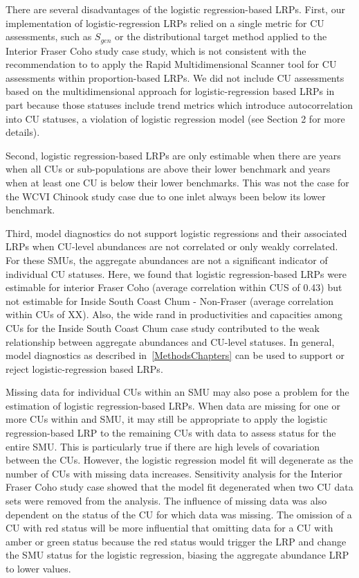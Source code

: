 \documentclass[11pt]{book}
\begin{document}
There are several disadvantages of the logistic regression-based LRPs. First, our implementation of logistic-regression LRPs relied on a single metric for CU assessments, such as \(S_{gen}\) or the distributional target method applied to the Interior Fraser Coho study case study, which is not consistent with the recommendation to to apply the Rapid Multidimensional Scanner tool for CU assessments within proportion-based LRPs. We did not include CU assessments based on the multidimensional approach for logistic-regression based LRPs in part because those statuses include trend metrics which introduce autocorrelation into CU statuses, a violation of logistic regression model (see Section 2 for more details).

Second, logistic regression-based LRPs are only estimable when there are years when all CUs or sub-populations are above their lower benchmark and years when at least one CU is below their lower benchmarks. This was not the case for the WCVI Chinook study case due to one inlet always been below its lower benchmark.

Third, model diagnostics do not support logistic regressions and their associated LRPs when CU-level abundances are not correlated or only weakly correlated. For these SMUs, the aggregate abundances are not a significant indicator of individual CU statuses. Here, we found that logistic regression-based LRPs were estimable for interior Fraser Coho (average correlation within CUS of 0.43) but not estimable for Inside South Coast Chum - Non-Fraser (average correlation within CUs of XX). Also, the wide rand in productivities and capacities among CUs for the Inside South Coast Chum case study contributed to the weak relationship between aggregate abundances and CU-level statuses. In general, model diagnostics as described in~\ref{MethodsChapters} can be used to support or reject logistic-regression based LRPs.

Missing data for individual CUs within an SMU may also pose a problem for the estimation of logistic regression-based LRPs. When data are missing for one or more CUs within and SMU, it may still be appropriate to apply the logistic regression-based LRP to the remaining CUs with data to assess status for the entire SMU. This is particularly true if there are high levels of covariation between the CUs. However, the logistic regression model fit will degenerate as the number of CUs with missing data increases. Sensitivity analysis for the Interior Fraser Coho study case showed that the model fit degenerated when two CU data sets were removed from the analysis. The influence of missing data was also dependent on the status of the CU for which data was missing. The omission of a CU with red status will be more influential that omitting data for a CU with amber or green status because the red status would trigger the LRP and change the SMU status for the logistic regression, biasing the aggregate abundance LRP to lower values.
\end{document}
